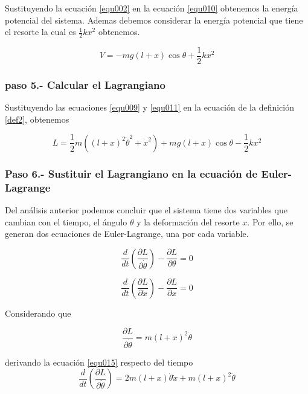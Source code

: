 \documentclass[12pt]{book}
\theoremstyle{definition}
\theoremstyle{remark}
\theoremstyle{plain}
\begin{document}
 Sustituyendo la ecuación \ref{equ002} en la ecuación \ref{equ010} obtenemos la energía potencial del sistema. Ademas debemos considerar la energía potencial que tiene el resorte la cual es $\frac{1}{2} k x^2$ obtenemos.

\begin{equation}
\label{equ011}
V = - m g (l+x) \cos \theta+\frac{1}{2} k x^2
\end{equation}

\subsubsection{paso 5.- Calcular el Lagrangiano}

Sustituyendo las ecuaciones \ref{equ009} y \ref{equ011} en la ecuación de la definición \ref{def2}, obtenemos

\begin{equation}
\label{equ012}
L =  \frac{1}{2}m (  (l+x)^2 \dot{\theta} ^2 + \dot{x} ^2 )+ m g (l+x) \cos \theta-\frac{1}{2} k x^2
\end{equation}

\subsubsection{Paso 6.- Sustituir el Lagrangiano en la ecuación de Euler-Lagrange}

Del análisis anterior podemos concluir que el sistema tiene dos variables que cambian con el tiempo, el ángulo $\theta$ y la deformación del resorte $x$. Por ello, se generan dos ecuaciones de Euler-Lagrange, una por cada variable.

\begin{equation}
\label{equ013}
\frac{d}{d t} \left ( \frac{\partial L}{\partial \dot {\theta}} \right )- \frac{\partial L}{\partial \theta} = 0
\end{equation}

\begin{equation}
\label{equ014}
\frac{d}{d t} \left ( \frac{\partial L}{\partial \dot {x}} \right )- \frac{\partial L}{\partial x} = 0
\end{equation}

Considerando que

\begin{equation}
\label{equ015}
\frac{\partial L}{\partial \dot{\theta}}=m (l+x)^2 \dot{\theta}
\end{equation}

derivando la ecuación \ref{equ015} respecto del tiempo
\begin{equation}
\label{equ016}
\frac{d}{d t} \left ( \frac{\partial L}{\partial \dot{\theta}} \right )=2 m (l+x) \dot{\theta} \dot{x} + m (l+x)^2 \ddot{\theta}
\end{equation}
\end{document}
